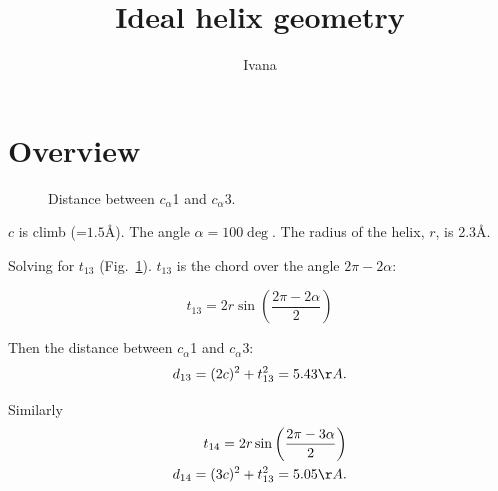 \documentclass[10pt]{scrartcl}
\title{Ideal helix geometry}
\author{Ivana}
\begin{document}
\maketitle



\section{Overview}



\begin{figure}[h]\label{triangle}
  \caption {Distance between $c_\alpha$1 and $c_\alpha$3.}
\end{figure}


$c$ is climb (=$1.5$\AA). The angle $\alpha = 100 \deg$. The radius of the helix, $r$, is 2.3\AA. 

Solving for $t_{13}$ (Fig.\, \ref{triangle}).
$t_{13}$  is the chord over the angle  $2\pi-2\alpha$:

\begin{equation}
t_{13} = 2r\sin\left(\frac{2\pi-2\alpha}{2}\right)
\end{equation}

Then the distance between $c_\alpha$1 and $c_\alpha$3:
\begin{equation}
d_{13} = (2c)^2+t_{13}^2 = 5.43\AA.
\end{equation}

Similarly
\begin{eqnarray}
t_{14} = 2r\sin\left(\frac{2\pi-3\alpha}{2}\right) \\
d_{14} = (3c)^2+t_{13}^2 = 5.05\AA.
\end{eqnarray}
\end{document}
